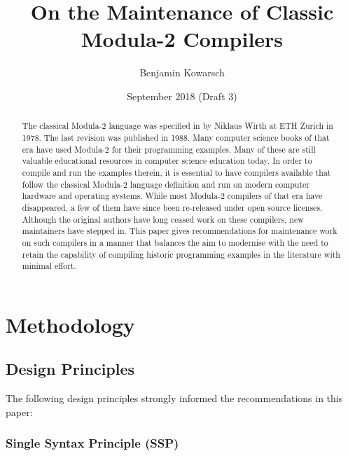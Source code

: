 \documentclass[10pt,a4paper]{article} %
\title{On the Maintenance of Classic Modula-2 Compilers}
\author{Benjamin Kowarsch}
\date{September 2018 (Draft 3)}
\makeatletter
\newcommand{\verbatimfont}[1]{\def\verbatim@font{#1}}
\makeatother
\begin{document}
\verbatimfont{\fontfamily{lmtt}\selectfont}
\maketitle

\begin{abstract}
The classical Modula-2 language was specified in \cite{Wirth78} by Niklaus Wirth at ETH Zurich in 1978.
The last revision \cite{Wirth88} was published in 1988. Many computer science books of that era have
used Modula-2 for their programming examples. Many of these are still valuable educational resources
in computer science education today. In order to compile and run the examples therein, it is essential
to have compilers available that follow the classical Modula-2 language definition and run on modern
computer hardware and operating systems. While most Modula-2 compilers of that era have disappeared,
a few of them have since been re-released under open source licenses. Although the original authors
have long ceased work on these compilers, new maintainers have stepped in. This paper gives
recommendations for maintenance work on such compilers in a manner that balances the aim to
modernise with the need to retain the capability of compiling historic programming examples in the
literature with minimal effort.
\end{abstract}


\section{Methodology}

\subsection{Design Principles}

The following design principles strongly informed the recommendations in this paper:

\subsubsection{Single Syntax Principle (SSP)}
\end{document}
